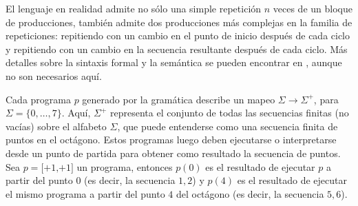 
El lenguaje en realidad admite no sólo una simple repetición $n$ veces de un bloque de producciones, también admite dos producciones más complejas en la familia de repeticiones: repitiendo con un cambio en el punto de inicio después de cada ciclo y repitiendo con un cambio en la secuencia resultante después de cada ciclo. Más detalles sobre la sintaxis formal y la semántica se pueden encontrar en \cite{marie2016}, aunque no son necesarios aquí. 


Cada programa $p$ generado por la gramática describe un mapeo $\Sigma\to\Sigma^+$, para $\Sigma=\{0,\dots,7\}$. Aquí, $\Sigma^+$ representa el conjunto de todas las secuencias finitas (no vacías) sobre el alfabeto $\Sigma$, que puede entenderse como una secuencia finita de puntos en el octágono. Estos programas luego deben ejecutarse o interpretarse desde un punto de partida para obtener como resultado la secuencia de puntos. Sea $p = \textrm{[+1,+1]}$ un programa, entonces $p(0)$ es el resultado de ejecutar $p$ a partir del punto $0$ (es decir, la secuencia $1,2$) y $p(4)$ es el resultado de ejecutar el mismo programa a partir del punto $4$ del octágono (es decir, la secuencia $5,6$).



